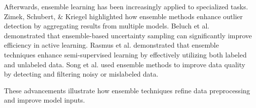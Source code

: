 Afterwards, ensemble learning has been increasingly applied to specialized tasks. Zimek, Schubert, \& Kriegel \cite{zimek2012survey}  highlighted how ensemble methods enhance outlier detection by aggregating results from multiple models. Beluch et al.\cite{beluch2018power} demonstrated that ensemble-based uncertainty sampling can significantly improve efficiency in active learning. Rasmus et al. \cite{rasmus2015semi} demonstrated that ensemble techniques enhance semi-supervised learning by effectively utilizing both labeled and unlabeled data. Song et al.\cite{song2022learning} used ensemble methods to improve data quality by detecting and filtering noisy or mislabeled data.

These advancements illustrate how ensemble techniques refine data preprocessing and improve model inputs.